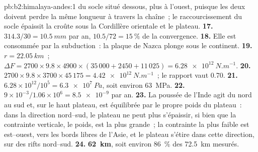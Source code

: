 \begin{solution}{pb:b2:himalaya-andes:1}
du socle situé dessous, plus à l'ouest, puisque les deux doivent perdre la même longueur à travers la
chaîne~; le raccourcissement du socle épaissit la croûte sous la Cordillère orientale et le plateau.
\textbf{17.} $314.3/30 = \qty{10.5}{mm}$ par an,
$10.5/72 = \qty{15}{\percent}$ de la convergence.
\textbf{18.} Elle est consommée par la subduction~: la plaque de Nazca plonge sous le continent.
\textbf{19.} $r = \qty{22.05}{km}$~; $\Delta F = 2700\times9.8\times4900\times(35\,000 + 2450
+ 11\,025) = \qty{6.28e12}{N.m^{-1}}$.
\textbf{20.} $2700\times9.8\times3700\times45\,175 = \qty{4.42e12}{N.m^{-1}}$~;
le rapport vaut 0.70.
\textbf{21.} $6.28\times10^{12}/10^{5} = \qty{6.3e7}{Pa}$, soit environ \qty{63}{MPa}.
\textbf{22.} $9\times10^{-3}/1.06\times10^{6} = \num{8.5e-9}$ par an.
\textbf{23.} La poussée de l'Inde agit du nord au sud et, sur le haut plateau, est équilibrée par le
propre poids du plateau~: dans la direction nord--sud, le plateau ne peut plus s'épaissir, si bien que
la contrainte verticale, le poids, est la plus grande~; la contrainte la plus faible est est--ouest,
vers les bords libres de l'Asie, et le plateau s'étire dans cette direction, sur des rifts nord--sud.
\textbf{24.} \textbf{\qty[text-series-to-math=true]{62}{km}},
soit environ \qty{86}{\percent} des \qty{72.5}{km} mesurés.
\end{solution}
